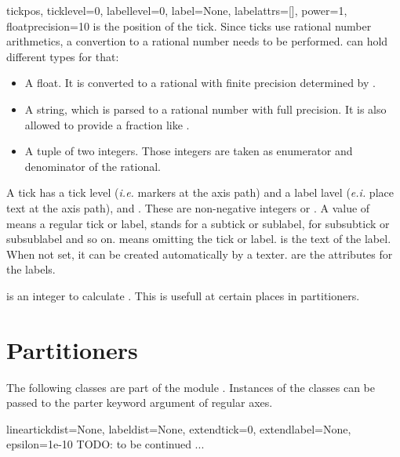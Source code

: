 \begin{classdesc}{tick}{pos, ticklevel=0, labellevel=0, label=None,
                        labelattrs=[], power=1, floatprecision=10}
   is the position of the tick. Since ticks use rational
  number arithmetics, a convertion to a rational number needs to be
  performed.  can hold different types for that:
  \begin{itemize}
  \item A float. It is converted to a rational with finite precision
    determined by .
  \item A string, which is parsed to a rational number with full
    precision. It is also allowed to provide a fraction like
    .
  \item A tuple of two integers. Those integers are taken as
    enumerator and denominator of the rational.
  \end{itemize}

  A tick has a tick level (\emph{i.e.} markers at the axis path) and a
  label lavel (\emph{e.i.} place text at the axis path),
   and . These are non-negative
  integers or . A value of  means a regular tick or
  label,  stands for a subtick or sublabel,  for
  subsubtick or subsublabel and so on.  means omitting the
  tick or label.  is the text of the label. When not set,
  it can be created automatically by a texter.  are
  the attributes for the labels.

   is an integer to calculate . This is
  usefull at certain places in partitioners.
\end{classdesc}

\section{Partitioners}


The following classes are part of the module .
Instances of the classes can be passed to the parter keyword argument
of regular axes.

\begin{classdesc}{linear}{tickdist=None, labeldist=None,
                          extendtick=0, extendlabel=None,
                          epsilon=1e-10}
  TODO: to be continued ...
\end{classdesc}

